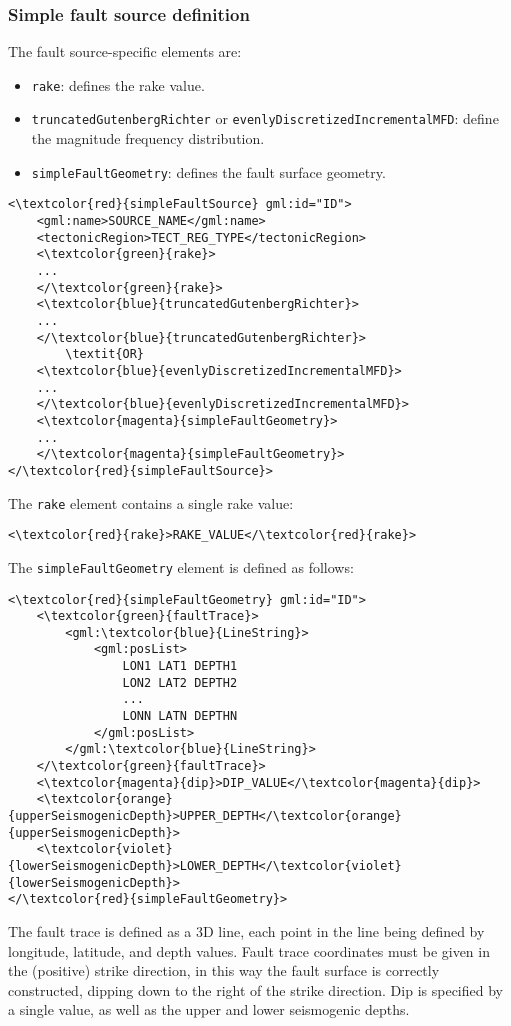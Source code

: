 \subsubsection{Simple fault source definition}
The fault source-specific elements are:
\begin{itemize}
\item \Verb+rake+: defines the rake value.
\item \Verb+truncatedGutenbergRichter+ or \Verb+evenlyDiscretizedIncrementalMFD+: define the magnitude frequency distribution.
\item \Verb+simpleFaultGeometry+: defines the fault surface geometry.
\end{itemize}
\begin{Verbatim}[frame=single, commandchars=\\\{\},fontsize=\normalsize, samepage=true]
<\textcolor{red}{simpleFaultSource} gml:id="ID">
	<gml:name>SOURCE_NAME</gml:name>
	<tectonicRegion>TECT_REG_TYPE</tectonicRegion>
	<\textcolor{green}{rake}>
	...
	</\textcolor{green}{rake}>
	<\textcolor{blue}{truncatedGutenbergRichter}>
	...
	</\textcolor{blue}{truncatedGutenbergRichter}>
		\textit{OR}
	<\textcolor{blue}{evenlyDiscretizedIncrementalMFD}>
	...
	</\textcolor{blue}{evenlyDiscretizedIncrementalMFD}>
	<\textcolor{magenta}{simpleFaultGeometry}>
	...
	</\textcolor{magenta}{simpleFaultGeometry}>
</\textcolor{red}{simpleFaultSource}>
\end{Verbatim}
The \Verb+rake+ element contains a single rake value:
\begin{Verbatim}[frame=single, commandchars=\\\{\},fontsize=\normalsize, samepage=true]
<\textcolor{red}{rake}>RAKE_VALUE</\textcolor{red}{rake}>
\end{Verbatim}
The \Verb+simpleFaultGeometry+ element is defined as follows:
\begin{Verbatim}[frame=single, commandchars=\\\{\},fontsize=\normalsize, samepage=true]
<\textcolor{red}{simpleFaultGeometry} gml:id="ID">
	<\textcolor{green}{faultTrace}>
		<gml:\textcolor{blue}{LineString}>
			<gml:posList>
				LON1 LAT1 DEPTH1
				LON2 LAT2 DEPTH2
				...
				LONN LATN DEPTHN
			</gml:posList>
		</gml:\textcolor{blue}{LineString}>
	</\textcolor{green}{faultTrace}>
	<\textcolor{magenta}{dip}>DIP_VALUE</\textcolor{magenta}{dip}>
	<\textcolor{orange}{upperSeismogenicDepth}>UPPER_DEPTH</\textcolor{orange}{upperSeismogenicDepth}>
	<\textcolor{violet}{lowerSeismogenicDepth}>LOWER_DEPTH</\textcolor{violet}{lowerSeismogenicDepth}>
</\textcolor{red}{simpleFaultGeometry}>
\end{Verbatim}
The fault trace is defined as a 3D line, each point in the line being defined by longitude, latitude, and depth values. Fault trace coordinates must be given in the (positive) strike direction, in this way the fault surface is correctly constructed, dipping down to the right of the strike direction. Dip is specified by a single value, as well as the upper and lower seismogenic depths. 

